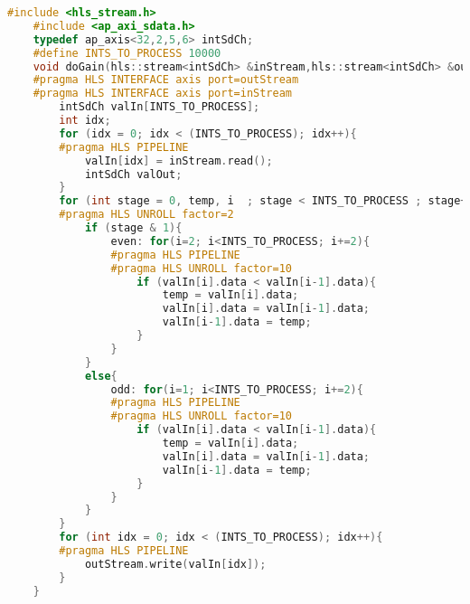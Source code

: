\begin{lstlisting}[basicstyle=\tiny,language=c++]
    #include <hls_stream.h>
    #include <ap_axi_sdata.h>
    typedef ap_axis<32,2,5,6> intSdCh;
    #define INTS_TO_PROCESS 10000
    void doGain(hls::stream<intSdCh> &inStream,hls::stream<intSdCh> &outStream){
    #pragma HLS INTERFACE axis port=outStream
    #pragma HLS INTERFACE axis port=inStream
        intSdCh valIn[INTS_TO_PROCESS];
        int idx;
        for (idx = 0; idx < (INTS_TO_PROCESS); idx++){
        #pragma HLS PIPELINE
            valIn[idx] = inStream.read();
            intSdCh valOut;
        }
        for (int stage = 0, temp, i  ; stage < INTS_TO_PROCESS ; stage++){
        #pragma HLS UNROLL factor=2
            if (stage & 1){
                even: for(i=2; i<INTS_TO_PROCESS; i+=2){
                #pragma HLS PIPELINE
                #pragma HLS UNROLL factor=10
                    if (valIn[i].data < valIn[i-1].data){
                        temp = valIn[i].data;
                        valIn[i].data = valIn[i-1].data;
                        valIn[i-1].data = temp;
                    }
                }
            }
            else{
                odd: for(i=1; i<INTS_TO_PROCESS; i+=2){
                #pragma HLS PIPELINE
                #pragma HLS UNROLL factor=10
                    if (valIn[i].data < valIn[i-1].data){
                        temp = valIn[i].data;
                        valIn[i].data = valIn[i-1].data;
                        valIn[i-1].data = temp;
                    }
                }
            }
        }
        for (int idx = 0; idx < (INTS_TO_PROCESS); idx++){
        #pragma HLS PIPELINE
            outStream.write(valIn[idx]);
        }
    }
\end{lstlisting}